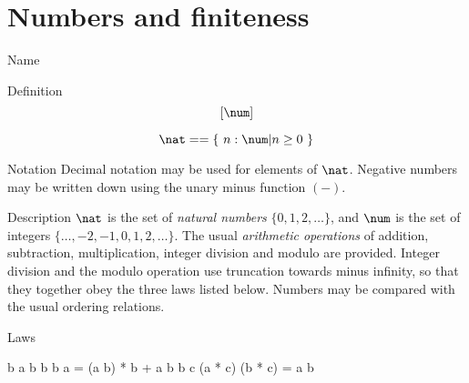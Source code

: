 \section{Numbers and finiteness}\label{s:numlib}
\begin{manpage}\label{p:3010}
\item[Name]

\item[Definition]
\[ [\num] \]
\[ \nat == \{~n: \num | n \geq 0~\} \]

\item[Notation]
Decimal notation may be used for elements of $\nat$.  Negative numbers
may be written down using the unary minus function $(\minus)$.

\item[Description]
$\nat$ is the set of {\em natural numbers\/} $\{ 0, 1, 2, \ldots \}$,
and $\num$ is the set of integers
$\{ \ldots, \minus 2, \minus 1, 0, 1, 2, \ldots \}$.
The usual {\em arithmetic operations\/} of addition, subtraction,
multiplication, integer division and modulo are provided. Integer
division and the modulo operation use truncation towards minus
infinity, so that they together obey the three laws listed below.
Numbers may be compared with the usual ordering relations.

\item[Laws]
\begin{laws}
        b   \leq a \mod b \lt b
\also
        b  \implies a = (a \div b) * b + a \mod b
\also
        b  \land c  \implies (a * c) \div (b * c) = a \div b
\end{laws}
\end{manpage}
